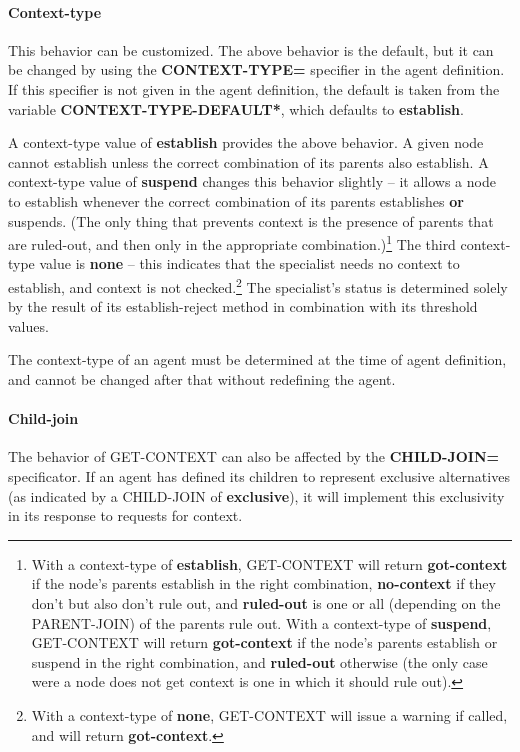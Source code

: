 \begin{itemize}
\paragraph{Context-type}

This behavior can be customized. The above
behavior is the default, but it can be changed by using the {\bf
CONTEXT-TYPE=} specifier in the agent definition. If this specifier is
not given in the agent definition, the default is taken from the
variable {\bf *CONTEXT-TYPE-DEFAULT*}, which defaults to {\bf
establish}.

A context-type value of {\bf establish} provides the above behavior. A
given node cannot establish unless the correct combination of its
parents also establish. A context-type value of {\bf suspend} changes
this behavior slightly -- it allows a node to establish whenever the
correct combination of its parents establishes {\bf or} suspends. (The
only thing that prevents context is the presence of parents that are
ruled-out, and then only in the appropriate
combination.)\footnote{With a context-type of {\bf establish},
GET-CONTEXT will return {\bf got-context} if the node's parents
establish in the right combination, {\bf no-context} if they don't but
also don't rule out, and {\bf ruled-out} is one or all (depending on
the PARENT-JOIN) of the parents rule out. With a context-type of {\bf
suspend}, GET-CONTEXT will return {\bf got-context} if the node's
parents establish or suspend in the right combination, and {\bf
ruled-out} otherwise (the only case were a node does not get context
is one in which it should rule out).} The third context-type value is
{\bf none} -- this indicates that the specialist needs no context to
establish, and context is not checked.\footnote{With a context-type of
{\bf none}, GET-CONTEXT will issue a warning if called, and will
return {\bf got-context}.} The specialist's status is determined
solely by the result of its establish-reject method in combination
with its threshold values.

The context-type of an agent must be determined at the time of agent
definition, and cannot be changed after that without redefining the agent.

\paragraph{Child-join}

The behavior of GET-CONTEXT can also be affected by the {\bf
CHILD-JOIN=} specificator. If an agent has defined its children to
represent exclusive alternatives (as indicated by a CHILD-JOIN of {\bf
exclusive}), it will implement this exclusivity in its response to
requests for context. 


\end{itemize}
